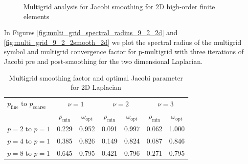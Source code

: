 \documentclass[review]{siamart190516}
\begin{document}
\begin{figure}[!tbp]
  \centering
  \caption{Multigrid analysis for Jacobi smoothing for 2D high-order finite elements}
\end{figure}

In Figures \ref{fig:multi_grid_spectral_radius_9_2_2d} and \ref{fig:multi_grid_9_2_2smooth_2d} we plot the spectral radius of the multigrid symbol and multigrid convergence factor for p-multigrid with three iterations of Jacobi pre and post-smoothing for the two dimensional Laplacian.

\begin{table}[ht!]
\begin{center}
\begin{tabular}{l cc cc cc}
  \toprule
  $p_{\text{fine}}$ to $p_{\text{coarse}}$  &  \multicolumn{2}{c}{$\nu = 1$}            &  \multicolumn{2}{c}{$\nu = 2$}          &  \multicolumn{2}{c}{$\nu = 3$}          \\
                                            &  $\rho_{\min}$  &  $\omega_{\text{opt}}$  &  $\rho_{\min}$ & $\omega_{\text{opt}}$  &  $\rho_{\min}$ & $\omega_{\text{opt}}$  \\
  \midrule
  $p = 2$ to $p = 1$          &  0.229 & 0.952  &  0.091 & 0.997  &  0.062 & 1.000   \\
  $p = 4$ to $p = 1$          &  0.385 & 0.826  &  0.149 & 0.824  &  0.087 & 0.846   \\
  $p = 8$ to $p = 1$          &  0.645 & 0.795  &  0.421 & 0.796  &  0.271 & 0.795   \\
  \bottomrule
\end{tabular}
\end{center}
\caption{Multigrid smoothing factor and optimal Jacobi parameter for 2D Laplacian}
\label{table:multi_grid_2d}
\end{table}
\end{document}
